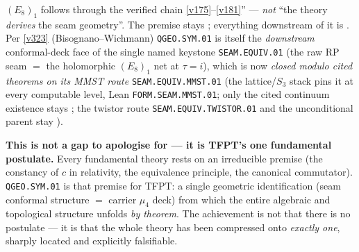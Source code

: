 \begin{keybox}
$(E_8)_1$ follows through the verified chain \vref{v175}--\vref{v181}'' --- \emph{not} ``the theory
\emph{derives} the seam geometry''. The premise stays \mO; everything downstream of it is \mE. Per
\vref{v323} (Bisognano--Wichmann) \texttt{QGEO.SYM.01} is itself the \emph{downstream} conformal-deck face
of the single named keystone \texttt{SEAM.EQUIV.01} (the raw RP seam $=$ the holomorphic $(E_8)_1$ net at
$\tau{=}i$), which is now \emph{closed modulo cited theorems on its MMST route} \texttt{SEAM.EQUIV.MMST.01}
(the lattice/$S_3$ stack pins it at every computable
level, Lean \texttt{FORM.SEAM.MMST.01}; only the cited continuum existence stays \mO; the twistor route
\texttt{SEAM.EQUIV.TWISTOR.01} and the unconditional parent stay \mO).
\par\smallskip\noindent\textbf{This is not a gap to apologise for --- it is TFPT's one fundamental
postulate.} Every fundamental theory rests on an irreducible premise (the constancy of $c$ in
relativity, the equivalence principle, the canonical commutator). \texttt{QGEO.SYM.01} is that premise
for TFPT: a single geometric identification (seam conformal structure $=$ carrier $\mu_4$ deck) from
which the entire algebraic and topological structure unfolds \emph{by theorem}. The achievement is not
that there is no postulate --- it is that the whole theory has been compressed onto \emph{exactly one},
sharply located and explicitly falsifiable.
\end{keybox}

